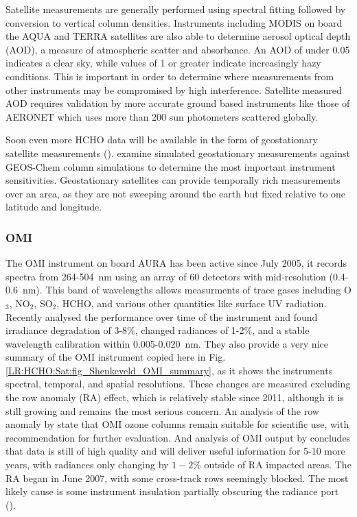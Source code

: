     Satellite measurements are generally performed using spectral fitting followed by conversion to vertical column densities.
    Instruments including MODIS on board the AQUA and TERRA satellites are also able to determine aerosol optical depth (AOD), a measure of atmospheric scatter and absorbance. 
    An AOD of under 0.05 indicates a clear sky, while values of 1 or greater indicate increasingly hazy conditions.
    This is important in order to determine where measurements from other instruments may be compromised by high interference.
    Satellite measured AOD requires validation by more accurate ground based instruments like those of AERONET which uses more than 200 sun photometers scattered globally.
    
    Soon even more HCHO data will be available in the form of geostationary satellite measurements (\textcite{Kwon2017}).
    \textcite{Kwon2017} examine simulated geostationary measurements against GEOS-Chem column simulations to determine the most important instrument sensitivities.
    Geostationary satellites can provide temporally rich measurements over an area, as they are not sweeping around the earth but fixed relative to one latitude and longitude.
    
    \subsubsection{OMI}
    
      The OMI instrument on board AURA has been active since July 2005, it records spectra from 264-504~nm using an array of 60 detectors with mid-resolution (0.4-0.6~nm).
      This band of wavelengths allows measurments of trace gases including O$_3$, NO$_2$, SO$_2$, HCHO, and various other quantities like surface UV radiation.
      Recently \textcite{Schenkeveld2017} analysed the performance over time of the instrument and found irradiance degradation of 3-8\%, changed radiances of 1-2\%, and a stable wavelength calibration within 0.005-0.020~nm.
      They also provide a very nice summary of the OMI instrument copied here in Fig. \ref{LR:HCHO:Sat:fig_Shenkeveld_OMI_summary}, as it shows the instruments spectral, temporal, and spatial resolutions.
      These changes are measured excluding the row anomaly (RA) effect, which is relatively stable since 2011, although it is still growing and remains the most serious concern.
      An analysis of the row anomaly by \textcite{Huang2017} state that OMI ozone columns remain suitable for scientific use, with recommendation for further evaluation.
      And analysis of OMI output by \textcite{Schenkeveld2017} concludes that data is still of high quality and will deliver useful information for 5-10 more years, with radiances only changing by $1-2\%$ outside of RA impacted areas.
      The RA began in June 2007, with some cross-track rows seemingly blocked. The most likely cause is some instrument insulation partially obscuring the radiance port (\textcite{Schenkeveld2017}).
      
